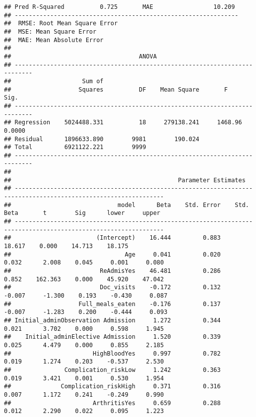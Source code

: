 \documentclass[
]{article}
\begin{document}
\begin{verbatim}
## Pred R-Squared          0.725       MAE                 10.209 
## ---------------------------------------------------------------
##  RMSE: Root Mean Square Error 
##  MSE: Mean Square Error 
##  MAE: Mean Absolute Error 
## 
##                                    ANOVA                                    
## ---------------------------------------------------------------------------
##                    Sum of                                                  
##                   Squares          DF    Mean Square       F          Sig. 
## ---------------------------------------------------------------------------
## Regression    5024488.331          18     279138.241     1468.96    0.0000 
## Residual      1896633.890        9981        190.024                       
## Total         6921122.221        9999                                      
## ---------------------------------------------------------------------------
## 
##                                               Parameter Estimates                                                
## ----------------------------------------------------------------------------------------------------------------
##                              model      Beta    Std. Error    Std. Beta       t        Sig      lower     upper 
## ----------------------------------------------------------------------------------------------------------------
##                        (Intercept)    16.444         0.883                  18.617    0.000    14.713    18.175 
##                                Age     0.041         0.020        0.032      2.008    0.045     0.001     0.080 
##                         ReAdmisYes    46.481         0.286        0.852    162.363    0.000    45.920    47.042 
##                         Doc_visits    -0.172         0.132       -0.007     -1.300    0.193    -0.430     0.087 
##                   Full_meals_eaten    -0.176         0.137       -0.007     -1.283    0.200    -0.444     0.093 
## Initial_adminObservation Admission     1.272         0.344        0.021      3.702    0.000     0.598     1.945 
##    Initial_adminElective Admission     1.520         0.339        0.025      4.479    0.000     0.855     2.185 
##                       HighBloodYes     0.997         0.782        0.019      1.274    0.203    -0.537     2.530 
##               Complication_riskLow     1.242         0.363        0.019      3.421    0.001     0.530     1.954 
##              Complication_riskHigh     0.371         0.316        0.007      1.172    0.241    -0.249     0.990 
##                       ArthritisYes     0.659         0.288        0.012      2.290    0.022     0.095     1.223 

\end{verbatim}
\end{document}
